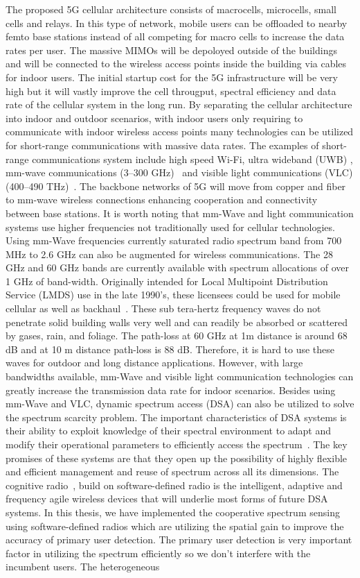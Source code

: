 The proposed 5G cellular architecture consists of macrocells, microcells, small cells and relays. In this type of network, mobile users can be offloaded to nearby femto base stations instead of all competing for macro cells to increase the data rates per user. The massive MIMOs will be depoloyed outside of the buildings and will be connected to the wireless access points inside the building via cables for indoor users. The initial startup cost for the 5G infrastructure will be very high but it will vastly improve the cell througput, spectral efficiency and data rate of the cellular system in the long run. By separating the cellular architecture into indoor and outdoor scenarios, with indoor users only requiring to communicate with indoor wireless access points many technologies can be utilized for short-range communications with massive data rates. The examples of short-range communications system include high speed Wi-Fi, ultra wideband (UWB) , mm-wave communications (3--300 GHz)~\cite{6515173} and visible light communications (VLC) (400--490 THz)~\cite{4212879}. The backbone networks of 5G will move from copper and fiber to mm-wave wireless connections enhancing cooperation and connectivity between base stations. It is worth noting that mm-Wave and light communication systems use higher frequencies not traditionally used for cellular technologies. Using mm-Wave frequencies currently saturated radio spectrum band from 700 MHz to 2.6 GHz can also be augmented for wireless communications. The 28 GHz and 60 GHz bands are currently available with spectrum allocations of over 1 GHz of band-width. Originally intended for Local Multipoint Distribution Service (LMDS) use in the late 1990's, these licensees could be used for mobile cellular as well as backhaul~\cite{502029}. These sub tera-hertz frequency waves do not penetrate solid building walls very well and can readily be absorbed or scattered by gases, rain, and foliage. The path-loss at 60 GHz at 1m distance is around 68 dB and at 10 m distance path-loss is 88 dB. Therefore, it is hard to use these waves for outdoor and long distance applications. However, with large bandwidths available, mm-Wave and visible light communication technologies can greatly increase the transmission data rate for indoor scenarios. Besides using mm-Wave and VLC, dynamic spectrum access (DSA) can also be utilized to solve the spectrum scarcity problem. The important characteristics of DSA systems is their ability to exploit knowledge of their spectral environment to adapt and modify their operational parameters to efficiently access the spectrum~\cite{4211144}. The key promises of these systems are that they open up the possibility of highly flexible and efficient management and reuse of spectrum across all its dimensions. The cognitive radio~\cite{819467}, build on software-defined radio is the intelligent, adaptive and frequency agile wireless devices that will underlie most forms of future DSA systems. In this thesis, we have implemented the cooperative spectrum sensing using software-defined radios which are utilizing the spatial gain to improve the accuracy of primary user detection. The primary user detection is very important factor in utilizing the spectrum efficiently so we don't interfere with the incumbent users. The heterogeneous 